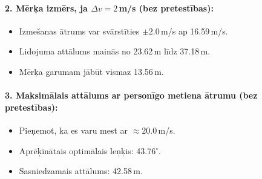 \documentclass[12pt]{article}
\begin{document}
\paragraph{2. Mērķa izmērs, ja \(\Delta v = 2\)\,m/s (bez pretestības):}
\begin{itemize}
\item Izmešanas ātrums var svārstīties \(\pm2.0\)\,m/s ap 16.59\,m/s.
\item Lidojuma attālums mainās no 23.62\,m līdz 37.18\,m.
\item Mērķa garumam jābūt vismaz 13.56\,m.
\end{itemize}

\paragraph{3. Maksimālais attālums ar personīgo metiena ātrumu (bez pretestības):}
\begin{itemize}
\item Pieņemot, ka es varu mest ar \(\approx 20.0\)\,m/s.
\item Aprēķinātais optimālais leņķis: 43.76$^\circ$.
\item Sasniedzamais attālums: 42.58\,m.
\end{itemize}
\end{document}
